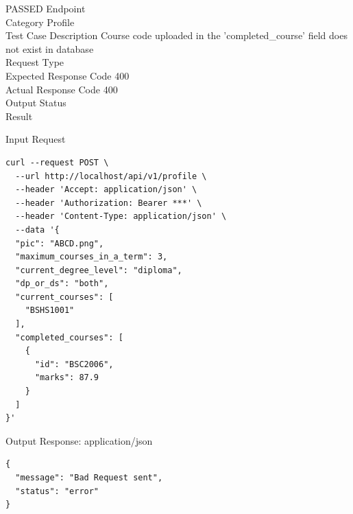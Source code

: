 \begin{testcase}{10}{PASSED}
Endpoint \hfill {}\\
Category \hfill Profile\\
Test Case Description \hfill Course code uploaded in the 'completed\_course' field does not exist in database\\

Request Type    \hfill {}\\
Expected Response Code    \hfill 400\\
Actual Response Code    \hfill 400\\

Output Status \hfill {}\\
Result \hfill {}

\begin{ipblock}{Input Request}
\begin{verbatim}
curl --request POST \
  --url http://localhost/api/v1/profile \
  --header 'Accept: application/json' \
  --header 'Authorization: Bearer ***' \
  --header 'Content-Type: application/json' \
  --data '{
  "pic": "ABCD.png",
  "maximum_courses_in_a_term": 3,
  "current_degree_level": "diploma",
  "dp_or_ds": "both",
  "current_courses": [
    "BSHS1001"
  ],
  "completed_courses": [
    {
      "id": "BSC2006",
      "marks": 87.9
    }
  ]
}'
\end{verbatim}
\end{ipblock}

\begin{opblock}{Output Response: application/json}
\begin{verbatim}
{
  "message": "Bad Request sent",
  "status": "error"
}
\end{verbatim}
\end{opblock}
\end{testcase}


